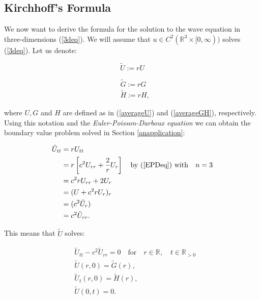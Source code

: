 \documentclass[a4paper, 12pt]{article}
\numberwithin{equation}{section}
\begin{document}
\subsection{Kirchhoff's Formula}
We now want to derive the formula for the solution to the wave equation in three-dimensions (\ref{3deq}). We will assume that $u \in C^2(\mathbb{R}^3 \times
[0, \infty))$ solves (\ref{3deq}). Let us denote:

\begin{equation} \label{Udash}
    \tilde{U}:=rU
\end{equation}

\begin{equation} \label{GHdash}
    \begin{aligned}
        &\tilde{G}:=rG\\
        &\tilde{H}:=rH,    
    \end{aligned}
\end{equation}

where $U,G$ and $H$ are defined as in (\ref{averageU}) and (\ref{averageGH}), respectively. 
\\

Using this notation and the \emph{Euler-Poisson-Darboux equation} we can
obtain the boundary value problem solved in Section \ref{anapplication}:

\begin{equation*}
    \begin{aligned}
        \tilde{U}_{tt}&=rU_{tt}\\
        &=r\left[c^2U_{rr}+\frac{2}{r}U_r\right] \quad \textrm{by (\ref{EPDeq}) with} \quad n=3\\
        &=c^2rU_{rr}+2U_r\\
        &=(U+c^2rU_r)_r\\
        &=(c^2\tilde{U}_r)\\
        &=c^2\tilde{U}_{rr}.        
    \end{aligned}
\end{equation*}

This means that $\tilde{U}$ solves:

\begin{equation} \label{tilUwave}
    \begin{aligned}
        &\tilde{U}_{tt}-c^2\tilde{U}_{rr}=0 \quad \textrm {for} \quad r \in \mathbb{R}, \quad t \in \mathbb{R}_{>0}\\
        &\tilde{U}(r, 0)=\tilde{G}(r), \\
        &\tilde{U}_t(r, 0)=\tilde{H}(r),\\
        &\tilde{U}(0, t)=0.
    \end{aligned}
\end{equation}
\end{document}
